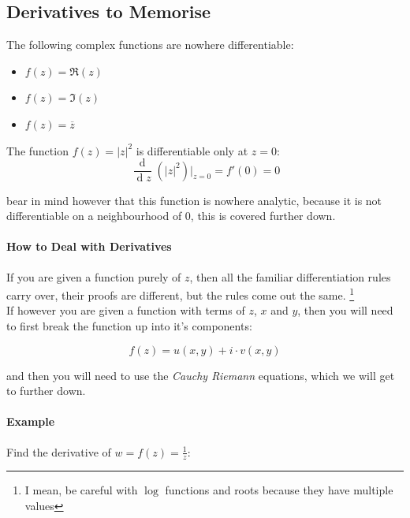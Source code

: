 \documentclass[class=article, crop=false]{standalone}
\begin{document}
\subsection{Derivatives to Memorise}
The following complex functions are nowhere differentiable:

\begin{itemize}
  \item $f\left( z \right)  = \Re{\left( z \right) }$ 
  \item $f\left( z \right) = \Im{\left( z \right) }  $ 
  \item $f\left( z \right)  = \overline{z}$ 
\end{itemize}

The function $f\left( z \right) =      \left| z \right|^{2}$ is differentiable only at $z =  0$:
\[
  \frac{\operatorname{d} }{\operatorname{d} z}\left(     \left| z \right|^{2} \right) \Big|_{z =  0} = f'\left( 0 \right) = 0
\]

bear in mind however that this function is nowhere analytic, because it is not differentiable on a neighbourhood of 0, this is covered further down.

\paragraph{How to Deal with Derivatives}
If you are given a function purely of $z$, then all the familiar differentiation rules carry over, their proofs are different, but the rules come out the same.  
\footnote{I mean, be careful with $\log$ functions and roots because they have multiple values}\\

If however you are given a function with terms of $z$, $x$ and $y$, then you will need to first break the function up into it's components:

\[
  f\left( z \right)  =  u\left( x,y \right) + i\cdot v\left( x,y \right) 
\]

and then you will need to use the \textit{Cauchy Riemann} equations, which we will get to further down.

\paragraph{Example}
Find the derivative of $w =  f\left( z \right) =  \frac{1}{z}$:
\end{document}
